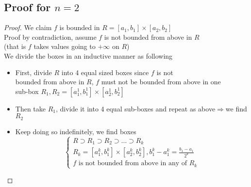 \documentclass[12pt]{article}
\begin{document}
\subsection*{Proof for $n=2$}
  \begin{proof}
    We claim $f$ is bounded in $R = [a_1,b_1]\times[a_2,b_2]$ \\
    Proof by contradiction, assume $f$ is not bounded from above in $R$ \\
    (that is $f$ takes values going to $+\infty$ on $R$) \\
    We divide the boxes in an inductive manner as following \\
    \begin{itemize}
      \item First, divide $R$ into 4 equal sized boxes since $f$ is not \\
      bounded from above in $R$, $f$ must not be bounded from above in one \\
      sub-box $R_1,R_2=[a_1^1,b_1^1]\times[a_2^1,b_2^1]$
      \item Then take $R_1$, divide it into 4 equal sub-boxes and repeat as above$\Rightarrow$we find $R_2$ \\
      \item Keep doing so indefinitely, we find boxes \\
      \begin{equation*}
        \begin{cases}
          R\supset R_1\supset R_2\supset\dots\supset R_k \\
          R_k=[a_1^k,b_1^k]\times[a_2^k,b_2^k],b_1^k-a_1^k=\frac{b_1-a_1}{2^k} \\
          f\text{ is not bounded from above in any of }R_k
        \end{cases}
      \end{equation*}
    \end{itemize}

\end{proof}
\end{document}
